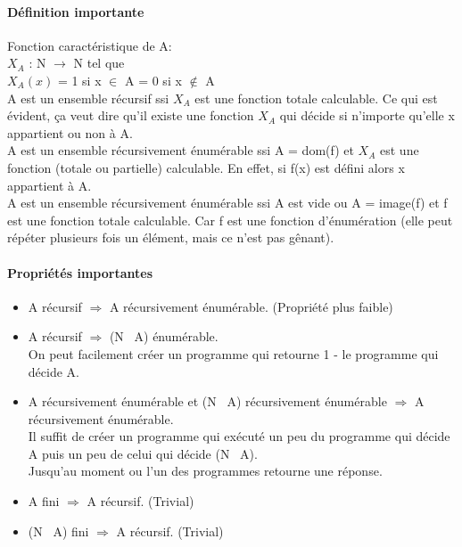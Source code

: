 \documentclass[11pt,a4paper]{article}
\begin{document}
\paragraph{Définition importante}
\label{par:d_finition_importante}
Fonction caractéristique de A: \\
$X_A$ : N $\rightarrow$ N tel que \\
$X_A(x)$ = 1 si x $\in$ A
       = 0 si x $\notin$ A %
\\
A est un ensemble récursif ssi $X_A$ est une fonction totale calculable. Ce qui
est évident, ça veut dire qu'il existe une fonction $X_A$ qui décide si n'importe
qu'elle x appartient ou non à A.\\
A est un ensemble récursivement énumérable ssi A = dom(f) et $X_A$ est une 
fonction (totale ou partielle) calculable. En effet, si f(x) est défini alors
x appartient à A.\\
A est un ensemble récursivement énumérable ssi A est vide ou A = image(f) et f
est une fonction totale calculable. Car f est une fonction d'énumération (elle
peut répéter plusieurs fois un élément, mais ce n'est pas gênant).\\

\paragraph{Propriétés importantes}
\label{par:propri_t_s_importantes}
\begin{itemize}
	\item A récursif $\Rightarrow$ A récursivement énumérable. (Propriété plus
		faible)
	\item A récursif $\Rightarrow$ (N \ A) énumérable.\\ On peut facilement créer
		un programme qui retourne 1 - le programme qui décide A.
	\item A récursivement énumérable et (N \ A) récursivement énumérable 
		$\Rightarrow$ A récursivement énumérable.\\ Il suffit de créer un programme
		qui exécuté un peu du programme qui décide A puis un peu de celui qui
		décide (N \ A). \\Jusqu'au moment ou l'un des programmes retourne une
		réponse.
	\item A fini $\Rightarrow$ A récursif. (Trivial)
	\item (N \ A) fini $\Rightarrow$ A récursif. (Trivial)
\end{itemize}
\end{document}
